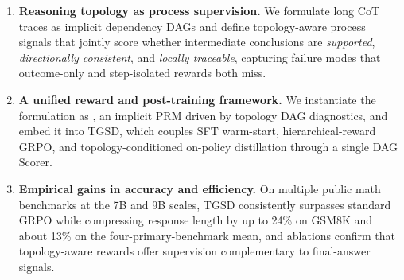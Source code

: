 \begin{enumerate}[leftmargin=*,itemsep=2pt]
\item \textbf{Reasoning topology as process supervision.} We formulate long CoT traces as implicit dependency DAGs and define topology-aware process signals that jointly score whether intermediate conclusions are \emph{supported}, \emph{directionally consistent}, and \emph{locally traceable}, capturing failure modes that outcome-only and step-isolated rewards both miss.
\item \textbf{A unified reward and post-training framework.} We instantiate the formulation as \textsc{\method}, an implicit PRM driven by topology DAG diagnostics, and embed it into \textsc{TGSD}, which couples SFT warm-start, hierarchical-reward GRPO, and topology-conditioned on-policy distillation through a single DAG Scorer.
\item \textbf{Empirical gains in accuracy and efficiency.} On multiple public math benchmarks at the 7B and 9B scales, \textsc{TGSD} consistently surpasses standard GRPO while compressing response length by up to 24\% on GSM8K and about 13\% on the four-primary-benchmark mean, and ablations confirm that topology-aware rewards offer supervision complementary to final-answer signals.
\end{enumerate}




